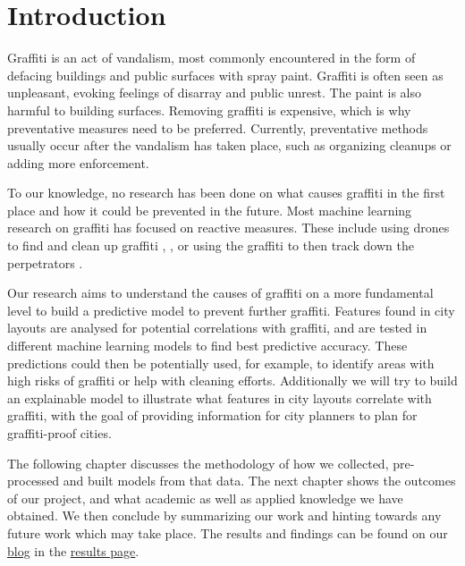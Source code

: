 \chapter{Introduction}


Graffiti is an act of vandalism, most commonly encountered in the form of defacing buildings and public surfaces with spray paint. Graffiti is often seen as unpleasant, evoking feelings of disarray and public unrest. The paint is also harmful to building surfaces. Removing graffiti is expensive, which is why preventative measures need to be preferred. Currently, preventative methods usually occur after the vandalism has taken place, such as organizing cleanups or adding more enforcement.

To our knowledge, no research has been done on what causes graffiti in the first place and how it could be prevented in the future. Most machine learning research on graffiti has focused on reactive measures. These include using drones to find and clean up graffiti \cite{uav}, \cite{drone}, or using the graffiti to then track down the perpetrators \cite{gang}.

Our research aims to understand the causes of graffiti on a more fundamental level to build a predictive model to prevent further graffiti. Features found in city layouts are analysed for potential correlations with graffiti, and are tested in different machine learning models to find best predictive accuracy. These predictions could then be potentially used, for example, to identify areas with high risks of graffiti or help with cleaning efforts. Additionally we will try to build an explainable model to illustrate what features in city layouts correlate with graffiti, with the goal of providing information for city planners to plan for graffiti-proof cities.

The following chapter discusses the methodology of how we collected, pre-processed and built models from that data. The next chapter shows the outcomes of our project, and what academic as well as applied knowledge we have obtained. We then conclude by summarizing our work and hinting towards any future work which may take place. The results and findings can be found on our \href{https://cowkeyman.github.io/PredictingGraffitiUsingCityLayouts/}{blog} in the \href{https://cowkeyman.github.io/PredictingGraffitiUsingCityLayouts/results.html}{results page}.

